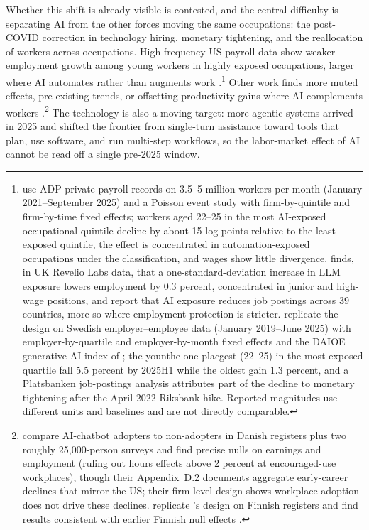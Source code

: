 \documentclass[12pt]{article}
\begin{document}
Whether this shift is already visible is contested, and the central difficulty is separating AI from the other forces moving the same occupations: the post-COVID correction in technology hiring, monetary tightening, and the reallocation of workers across occupations. High-frequency US payroll data show weaker employment growth among young workers in highly exposed occupations, larger where AI automates rather than augments work \citep{brynjolfsson2025}.\footnote{\citet{brynjolfsson2025} use ADP private payroll records on 3.5--5 million workers per month (January 2021--September 2025) and a Poisson event study with firm-by-quintile and firm-by-time fixed effects; workers aged 22--25 in the most AI-exposed occupational quintile decline by about 15 log points relative to the least-exposed quintile, the effect is concentrated in automation-exposed occupations under the \citet{handa2025} classification, and wages show little divergence. \citet{teeselink2025} finds, in UK Revelio Labs data, that a one-standard-deviation increase in LLM exposure lowers employment by 0.3 percent, concentrated in junior and high-wage positions, and \citet{teeselink2026} report that AI exposure reduces job postings across 39 countries, more so where employment protection is stricter. \citet{lodefalk2026} replicate the design on Swedish employer--employee data (January 2019--June 2025) with employer-by-quartile and employer-by-month fixed effects and the DAIOE generative-AI index of \citet{engberg2024}; the younthe one placgest (22--25) in the most-exposed quartile fall 5.5 percent by 2025H1 while the oldest gain 1.3 percent, and a Platsbanken job-postings analysis attributes part of the decline to monetary tightening after the April 2022 Riksbank hike. Reported magnitudes use different units and baselines and are not directly comparable.} Other work finds more muted effects, pre-existing trends, or offsetting productivity gains where AI complements workers \citep{humlum2026, kauhanen2026}.\footnote{\citet{humlum2026} compare AI-chatbot adopters to non-adopters in Danish registers plus two roughly 25,000-person surveys and find precise nulls on earnings and employment (ruling out hours effects above 2 percent at encouraged-use workplaces), though their Appendix~D.2 documents aggregate early-career declines that mirror the US; their firm-level design shows workplace adoption does not drive these declines. \citet{kauhanen2026} replicate \citet{brynjolfsson2025}'s design on Finnish registers and find results consistent with earlier Finnish null effects \citep{kauhanen2024, kauhanen2025}.} The technology is also a moving target: more agentic systems arrived in 2025 and shifted the frontier from single-turn assistance toward tools that plan, use software, and run multi-step workflows, so the labor-market effect of AI cannot be read off a single pre-2025 window.
\end{document}
